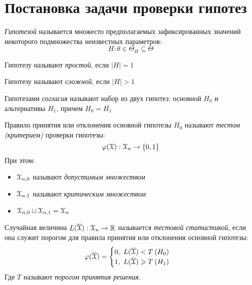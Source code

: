 \section{Постановка задачи проверки гипотез}

\begin{definition}
	\textit{Гипотезой} называется множесто предполагаемых зафиксированных значений
	некоторого подмножества неизвестных параметров:
	\[
		H: \theta \in \Theta_{H} \subseteq \Theta
	\]
\end{definition}

\begin{definition}
	Гипотезу называют \textit{простой}, если $|H| = 1$
\end{definition}

\begin{definition}
	Гипотезу называют \textit{сложной}, если $|H| > 1$
\end{definition}

\begin{definition}
	Гипотезами \textit{согласия} называют набор из двух гипотез: основной $H_0$ и
	альтернативы $H_1$, причем $H_0 = \overline{H_1}$
\end{definition}

\begin{definition}
	Правило принятия или отклонения основной гипотезы $H_0$ называют
	\textit{тестом (критерием)} проверки гипотезы:
	\[
		\varphi(\mathcal{X}): \mathcal{X}_{n} \to \{0, 1\}
	\]
	При этом:
	\begin{itemize}
		\item $\mathcal{X}_{n, 0}$ называют \textit{допустимым множеством}
		\item $\mathcal{X}_{n, 1}$ называют \textit{критическим множеством}
		\item $\mathcal{X}_{n, 0} \sqcup \mathcal{X}_{n, 1} = \mathcal{X}_{n}$
	\end{itemize}
\end{definition}

\begin{definition}
	Случайная величина $L(\overline{\mathcal{X}}): \mathcal{X}_n \to \mathbb{R}$ называется
	\textit{тестовой статистикой}, если она служит порогом для правила принятия
	или отклонения основной гипотезы:
	\[
		\varphi(\overline{\mathcal{X}}) = \begin{cases}
			0,~ L(\overline{\mathcal{X}}) < T \> (H_0) \\
			1,~ L(\overline{\mathcal{X}}) \geqslant T \> (H_1)
		\end{cases}
	\]
	Где $T$ называют \textit{порогом принятия решения}.
\end{definition}

